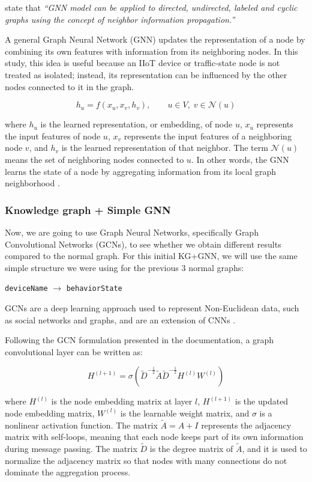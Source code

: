 \documentclass[final,5p,times,twocolumn]{elsarticle}
\begin{document}
\citet[p.~49118]{bilot2023graph} state that \textit{``GNN model can be applied to directed, undirected, labeled and cyclic graphs using the concept of neighbor information propagation.''}

A general Graph Neural Network (GNN) updates the representation of a node by combining its own features with information from its neighboring nodes. In this study, this idea is useful because an IIoT device or traffic-state node is not treated as isolated; instead, its representation can be influenced by the other nodes connected to it in the graph.

\[
h_u = f(x_u, x_v, h_v), \qquad u \in V,\; v \in \mathcal{N}(u)
\]

where \(h_u\) is the learned representation, or embedding, of node \(u\), \(x_u\) represents the input features of node \(u\), \(x_v\) represents the input features of a neighboring node \(v\), and \(h_v\) is the learned representation of that neighbor. The term \(\mathcal{N}(u)\) means the set of neighboring nodes connected to \(u\). In other words, the GNN learns the state of a node by aggregating information from its local graph neighborhood \citep{bilot2023graph}.

\begingroup
\color{red}
\subsubsection{Knowledge graph + Simple GNN}
\label{Knowledge graph + Simple GNN}
Now, we are going to use Graph Neural Networks, specifically Graph Convolutional Networks (GCNs), to see whether we obtain different results compared to the normal graph. For this initial KG+GNN, we will use the same simple structure we were using for the previous 3 normal graphs:

\begin{center}
\texttt{deviceName} \(\rightarrow\) \texttt{behaviorState}
\end{center}

GCNs are a deep learning approach used to represent Non-Euclidean data, such as social networks and graphs, and are an extension of CNNs \citep{jiang2019anomaly}.


Following the GCN formulation presented in the \cite{dgl_gcn_tutorial} documentation, a graph convolutional layer can be written as:

\[
H^{(l+1)}
=
\sigma
\left(
\tilde{D}^{-\frac{1}{2}}
\tilde{A}
\tilde{D}^{-\frac{1}{2}}
H^{(l)}
W^{(l)}
\right)
\]

where \(H^{(l)}\) is the node embedding matrix at layer \(l\), \(H^{(l+1)}\) is the updated node embedding matrix, \(W^{(l)}\) is the learnable weight matrix, and \(\sigma\) is a nonlinear activation function. The matrix \(\tilde{A} = A + I\) represents the adjacency matrix with self-loops, meaning that each node keeps part of its own information during message passing. The matrix \(\tilde{D}\) is the degree matrix of \(\tilde{A}\), and it is used to normalize the adjacency matrix so that nodes with many connections do not dominate the aggregation process.
\end{document}
